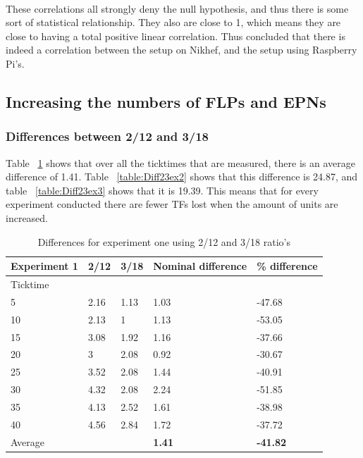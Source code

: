 ~\\ These correlations all strongly deny the null hypothesis, and thus there is some sort of statistical relationship. They also are close to 1, which means they are close to having a total positive linear correlation. Thus concluded that there is indeed a correlation between the setup on Nikhef, and the setup using Raspberry Pi's.

\subsection{Increasing the numbers of FLPs and EPNs}

\subsubsection*{Differences between 2/12 and 3/18}
Table ~\ref{table:Diff23ex1} shows that over all the ticktimes that are measured, there is an average difference of 1.41. Table ~\ref{table:Diff23ex2} shows that this difference is 24.87, and table ~\ref{table:Diff23ex3} shows that it is 19.39. This means that for every experiment conducted there are fewer TFs lost when the amount of units are increased.

\begin{table}[!htbp]
\begin{tabular}{| l | l | l | l | l |}
\hline
Experiment 1 & 2/12 & 3/18 & Nominal difference & \% difference \\ \hline
Ticktime &&&& \\ \hline
5 & 2.16 & 1.13 & 1.03 & -47.68 \\ \hline
10 & 2.13 & 1 & 1.13 & -53.05 \\ \hline
15 & 3.08 & 1.92 & 1.16 & -37.66 \\ \hline
20 & 3 & 2.08 & 0.92 & -30.67 \\ \hline
25 & 3.52 & 2.08 & 1.44 & -40.91 \\ \hline
30 & 4.32 & 2.08 & 2.24 & -51.85 \\ \hline
35 & 4.13 & 2.52 & 1.61 & -38.98 \\ \hline
40 & 4.56 & 2.84 & 1.72 & -37.72 \\ \hline \hline
Average &&& \textbf{1.41} & \textbf{-41.82} \\ \hline
\end{tabular}
\caption{Differences for experiment one using 2/12 and 3/18 ratio's}
\label{table:Diff23ex1}
\end{table}

